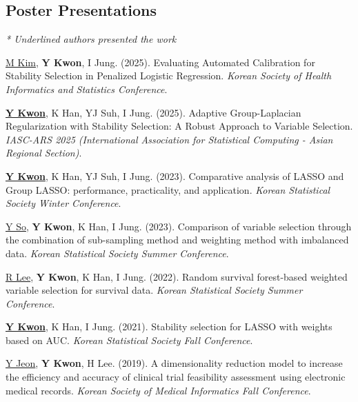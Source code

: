 \documentclass[10pt,a4paper]{article}
\newenvironment{conflist}{%
    \renewcommand{\labelenumi}{\color{subheadercolor}[\theenumi]}%
    \begin{etaremune}[itemsep=0.3em]%
}{\end{etaremune}}
\begin{document}
\subsection*{Poster Presentations}
{\small \textit{* Underlined authors presented the work}}\\[0.3em]
\begin{conflist}
    \item \underline{M Kim}, \textbf{Y Kwon}, I Jung. (2025).
    Evaluating Automated Calibration for Stability Selection in Penalized Logistic Regression.
    \textit{Korean Society of Health Informatics and Statistics Conference}.

    \item \underline{\textbf{Y Kwon}}, K Han, YJ Suh, I Jung. (2025).
    Adaptive Group-Laplacian Regularization with Stability Selection: A Robust Approach to Variable Selection.
    \textit{IASC-ARS 2025 (International Association for Statistical Computing - Asian Regional Section)}.

    \item \underline{\textbf{Y Kwon}}, K Han, YJ Suh, I Jung. (2023).
    Comparative analysis of LASSO and Group LASSO: performance, practicality, and application.
    \textit{Korean Statistical Society Winter Conference}.

    \item \underline{Y So}, \textbf{Y Kwon}, K Han, I Jung. (2023).
    Comparison of variable selection through the combination of sub-sampling method and weighting method with imbalanced data.
    \textit{Korean Statistical Society Summer Conference}.

    \item \underline{R Lee}, \textbf{Y Kwon}, K Han, I Jung. (2022).
    Random survival forest-based weighted variable selection for survival data.
    \textit{Korean Statistical Society Summer Conference}.

    \item \underline{\textbf{Y Kwon}}, K Han, I Jung. (2021).
    Stability selection for LASSO with weights based on AUC.
    \textit{Korean Statistical Society Fall Conference}.

    \item \underline{Y Jeon}, \textbf{Y Kwon}, H Lee. (2019).
    A dimensionality reduction model to increase the efficiency and accuracy of clinical trial feasibility assessment using electronic medical records.
    \textit{Korean Society of Medical Informatics Fall Conference}.
\end{conflist}
\end{document}
